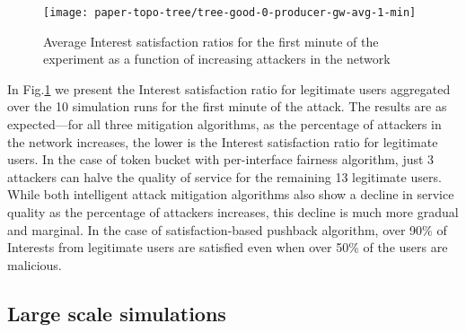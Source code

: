 
\begin{figure}[htbp]
  \centering
  \texttt{[image: paper-topo-tree/tree-good-0-producer-gw-avg-1-min]}
  \vspace{-.3cm}
  \caption{Average Interest satisfaction ratios for the first minute of the experiment as a function of increasing attackers in the network}\vspace{-.1cm}
  \label{fig:small-scale-topo boxplot}
\end{figure}

In Fig.\ref{fig:small-scale-topo boxplot} we present  the Interest satisfaction ratio for legitimate users aggregated over the 10 simulation runs for the first minute of the attack. The results are as expected---for all three mitigation algorithms, as the percentage of attackers in the network increases, the lower is the Interest satisfaction ratio for legitimate users.
In the case of token bucket with per-interface fairness algorithm, just 3 attackers can halve the quality of service for the remaining 13 legitimate users. While both intelligent attack mitigation algorithms also show a decline in service quality as the percentage of attackers increases, this decline is much more gradual and marginal. In the case of satisfaction-based pushback algorithm, over 90\% of Interests from legitimate users are satisfied even when over 50\% of the users are malicious.  
 




\subsection{Large scale simulations}
\label{sec:largescale}

